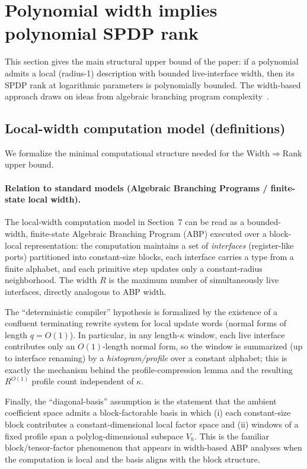 \documentclass[12pt]{article}
\theoremstyle{definition}
\theoremstyle{remark}
\begin{document}
\section{Polynomial width implies polynomial SPDP rank}
\label{sec:width-implies-rank}

This section gives the main structural upper bound of the paper:
if a polynomial admits a local (radius-1) description with bounded live-interface width,
then its SPDP rank at logarithmic parameters is polynomially bounded. The width-based
approach draws on ideas from algebraic branching program complexity~\citep{Nisan1991,FS2013,SY2010}.

\subsection{Local-width computation model (definitions)}
\label{subsec:model-defs}

We formalize the minimal computational structure needed for the Width$\Rightarrow$Rank
upper bound.

\paragraph{Relation to standard models (Algebraic Branching Programs / finite-state local width).}
The local-width computation model in Section~7 can be read as a bounded-width,
finite-state Algebraic Branching Program (ABP) executed over a block-local
representation: the computation maintains a set of \emph{interfaces} (register-like
ports) partitioned into constant-size blocks, each interface carries a type from a
finite alphabet, and each primitive step updates only a constant-radius neighborhood.
The width $R$ is the maximum number of simultaneously live interfaces, directly
analogous to ABP width.

The ``deterministic compiler'' hypothesis is formalized by the existence of a
confluent terminating rewrite system for local update words (normal forms of length
$q=O(1)$). In particular, in any length-$\kappa$ window, each live interface contributes
only an $O(1)$-length normal form, so the window is summarized (up to interface
renaming) by a \emph{histogram/profile} over a constant alphabet; this is exactly the
mechanism behind the profile-compression lemma and the resulting $R^{O(1)}$ profile
count independent of $\kappa$.

Finally, the ``diagonal-basis'' assumption is the statement that the ambient
coefficient space admits a block-factorable basis in which (i) each constant-size
block contributes a constant-dimensional local factor space and (ii) windows of a
fixed profile span a polylog-dimensional subspace $V_h$. This is the familiar
block/tensor-factor phenomenon that appears in width-based ABP analyses when the
computation is local and the basis aligns with the block structure.
\end{document}
